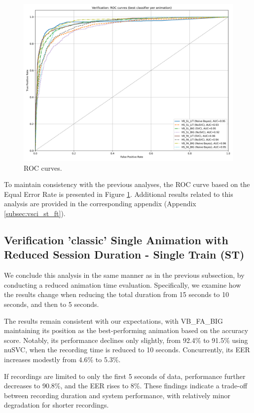 \documentclass[12pt]{report}
\begin{document}
\begin{figure}[ht]
    \centering
    \includegraphics[width = 0.6
    \textwidth]{Images/Results/Classic_procedure/Verification_intruders/st/Verification_single_intruders_roc_two_st.png}
    \caption{ROC curves.}
    \label{fig:roc_cist}
\end{figure}

To maintain consistency with the previous analyses, the ROC curve based on the Equal Error Rate is presented in Figure \ref{fig:roc_cist}. 
Additional results related to this analysis are provided in the corresponding appendix (Appendix \ref{subsec:vsci_st_ft}).
\FloatBarrier

\subsection{Verification 'classic' Single Animation with Reduced Session Duration - Single Train (ST)}

We conclude this analysis in the same manner as in the previous subsection, by conducting a reduced animation time evaluation. 
Specifically, we examine how the results change when reducing the total duration from 15 seconds to 10 seconds, and then to 5 seconds.

The results remain consistent with our expectations, with VB\_FA\_BIG maintaining its position as the best-performing animation based on the accuracy score. 
Notably, its performance declines only slightly, from 92.4\% to 91.5\% using nuSVC, when the recording time is reduced to 10 seconds. 
Concurrently, its EER increases modestly from 4.6\% to 5.3\%.

If recordings are limited to only the first 5 seconds of data, performance further decreases to 90.8\%, and the EER rises to 8\%. 
These findings indicate a trade-off between recording duration and system performance, with relatively minor degradation for shorter recordings.
\end{document}
